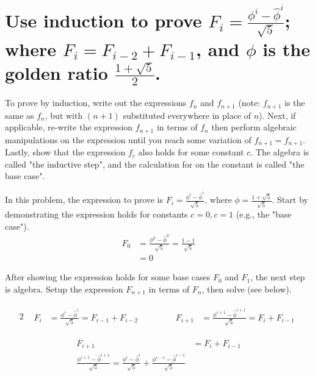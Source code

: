 \section[Problem 2]{Use induction to prove $F_i = \frac{\phi^i - \hat{\phi}^i}{\sqrt{5}}$; where $F_i = F_{i-2} + F_{i-1}$, and $\phi$ is the golden ratio $\frac{1 + \sqrt{5}}{2}$.}

To prove by induction, write out the expressions $f_n$ and $f_{n + 1}$ (note: $f_{n + 1}$ is the same as $f_n$, but with $(n + 1)$ substituted everywhere in place of $n$). Next, if applicable, re-write the expression $f_{n + 1}$ in terms of $f_n$ then perform algebraic manipulations on the expression until you reach some variation of $f_{n + 1} = f_{n + 1}$.  Lastly, show that the expression $f_c$ also holds for some constant $c$. The algebra is called "the inductive step", and the calculation for on the constant is called "the base case".

In this problem, the expression to prove is $F_i = \frac{\phi^i - \hat{\phi}^i}{\sqrt{5}}$, where $\phi = \frac{1 + \sqrt{5}}{\sqrt{5}}$. Start by demonstrating the expression holds for constants $c = 0, c = 1$ (e.g., the "base case"). 
\begin{align}
	F_0 &= \frac{\phi^0 - \hat{\phi}^0}{\sqrt{5}} = \frac{1 - 1}{\sqrt{5}} \\[16pt]
		&= 0 
\end{align}

After showing the expression holds for some base cases $F_0$ and $F_1$, the next step is algebra. Setup the expression $F_{n + 1}$ in terms of $F_n$, then solve (see below).

\setcounter{equation}{0}
\begin{alignat*}{2}
	&
	\begin{aligned}
		F_i &= \frac{\phi^i - \hat{\phi}^i}{\sqrt{5}} = F_{i - 1} + F_{i - 2}
	\end{aligned}
	& \qquad &
	\begin{aligned}
		F_{i + 1} &= \frac{\phi^{i + 1} - \hat{\phi}^{i + 1}}{\sqrt{5}} = F_{i} + F_{i - 1}
	\end{aligned}
\end{alignat*}

\begin{align}
	F_{i + 1} &= F_{i} + F_{i - 1} \\
	\frac{\phi^{i + 1} - \hat{\phi}^{i + 1}}{\sqrt{5}} =  
	\frac{\phi^{i} - \hat{\phi}^{i}}{\sqrt{5}} +
	\frac{\phi^{i - 1} - \hat{\phi}^{i - 1}}{\sqrt{5}}
\end{align}
